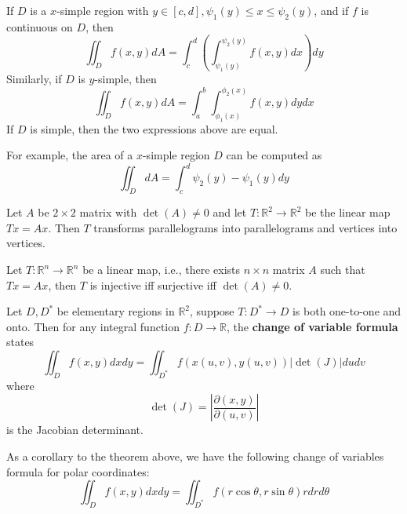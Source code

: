 \documentclass[openany]{book}
\newcommand{\R}{\mathbb{R}}
\begin{document}
\begin{prop}
    If $D$ is a $x$-simple region with $y\in[c,d], \psi_1(y)\leq x\leq\psi_2(y)$, and if $f$ is continuous on $D$, then 
    \begin{equation*}
        \iint_Df(x,y)dA=\int_c^d\left(\int_{\psi_1(y)}^{\psi_2(y)}f(x,y)dx\right)dy
    \end{equation*}
    Similarly, if $D$ is $y$-simple, then
    \begin{equation*}
        \iint_Df(x,y)dA=\int_a^b\int_{\phi_1(x)}^{\phi_2(x)}f(x,y)dydx
    \end{equation*}
    If $D$ is simple, then the two expressions above are equal.
\end{prop}
For example, the area of a $x$-simple region $D$ can be computed as 
    \begin{equation*}
        \iint_DdA=\int_c^d\psi_2(y)-\psi_1(y)dy
    \end{equation*}

\begin{prop}
    Let $A$ be $2\times 2$ matrix with $\det(A)\neq 0$ and let $T:\R^2\to\R^2$ be the linear map $Tx=Ax$. Then $T$ transforms parallelograms into parallelograms and vertices into vertices.
\end{prop}

\begin{prop}
    Let $T:\R^n\to\R^n$ be a linear map, i.e., there exists $n\times n$ matrix $A$ such that $Tx=Ax$, then $T$ is injective iff surjective iff $\det(A)\neq 0$.
\end{prop}


\begin{thm}
    Let $D,D^*$ be elementary regions in $\R^2$, suppose $T:D^*\to D$ is both one-to-one and onto. Then for any integral function $f:D\to\R$, the \textbf{change of variable formula} states
    \begin{equation*}
        \iint_Df(x,y)dxdy=\iint_{D^*}f(x(u,v),y(u,v))\left|\det(J)\right|dudv
    \end{equation*}
    where 
    \begin{equation*}
        \det(J)=\left|\frac{\partial(x,y)}{\partial(u,v)}\right|
    \end{equation*}
    is the Jacobian determinant. 
\end{thm}

\begin{prop}
    As a corollary to the theorem above, we have the following change of variables formula for polar coordinates:
    \begin{equation*}
        \iint_Df(x,y)dxdy=\iint_{D^*}f(r\cos\theta, r\sin\theta)rdrd\theta
    \end{equation*}
\end{prop}
\end{document}
